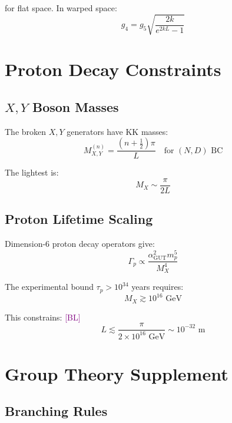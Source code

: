 \documentclass[11pt,a4paper]{article}
\newcommand{\tagBL}{\textcolor{purple}{[BL]}}
\begin{document}
for flat space. In warped space:
\begin{equation}
\label{eq:warped-coupling}
g_4 = g_5 \sqrt{\frac{2k}{e^{2kL}-1}}
\end{equation}

\section{Proton Decay Constraints}
\label{app:proton}

\subsection{$X, Y$ Boson Masses}

The broken $X, Y$ generators have KK masses:
\begin{equation}
\label{eq:XY-mass}
M_{X,Y}^{(n)} = \frac{(n+\tfrac{1}{2})\pi}{L} \quad \text{for } (N,D) \text{ BC}
\end{equation}

The lightest is:
\begin{equation}
\label{eq:XY-lightest}
M_X \sim \frac{\pi}{2L}
\end{equation}

\subsection{Proton Lifetime Scaling}

Dimension-6 proton decay operators give:
\begin{equation}
\label{eq:proton-rate}
\Gamma_p \propto \frac{\alpha_{\text{GUT}}^2 m_p^5}{M_X^4}
\end{equation}

The experimental bound $\tau_p > 10^{34}$ years requires:
\begin{equation}
\label{eq:MX-bound}
M_X \gtrsim 10^{16} \text{ GeV}
\end{equation}

This constrains: \tagBL
\begin{equation}
\label{eq:L-bound}
L \lesssim \frac{\pi}{2 \times 10^{16} \text{ GeV}} \sim 10^{-32} \text{ m}
\end{equation}

\section{Group Theory Supplement}
\label{app:group-supp}

\subsection{Branching Rules}
\end{document}
